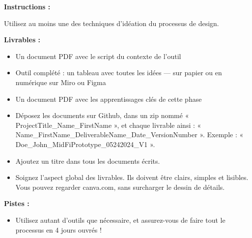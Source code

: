 \makeheaderfiles

\textbf{Instructions :}

Utilisez au moins une des techniques d'idéation du processus de design.

\textbf{Livrables :}

\begin{itemize}
\item Un document PDF avec le script du contexte de l'outil
\item Outil complété : un tableau avec toutes les idées  ---  sur papier ou en numérique sur Miro ou Figma
\item Un document PDF avec les apprentissages clés de cette phase
\item Déposez les documents sur Github, dans un zip nommé « ProjectTitle\_Name\_FirstName », et chaque livrable ainsi : « Name\_FirstName\_DeliverableName\_Date\_VersionNumber ». Exemple : « Doe\_John\_MidFiPrototype\_05242024\_V1 ».
\item Ajoutez un titre dans tous les documents écrits.
\item Soignez l'aspect global des livrables. Ils doivent être clairs, simples et lisibles. Vous pouvez regarder canva.com, sans surcharger le dessin de détails.
\end{itemize}

\textbf{Pistes :}

\begin{itemize}
\item Utilisez autant d'outils que nécessaire, et assurez-vous de faire tout le processus en 4 jours ouvrés !
\end{itemize}

